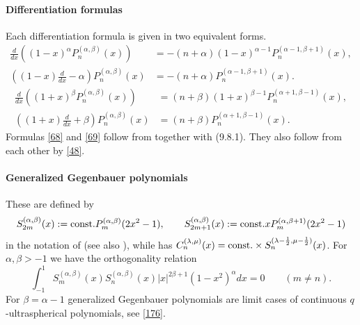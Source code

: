 \documentclass[twoside,11pt]{article}
\newcommand\al\alpha
\newcommand\be\beta
\newcommand\la\lambda
\newcommand\half{\frac12}
\newcommand\const{{\rm const.} }
\begin{document}
\paragraph{Differentiation formulas}
Each differentiation formula is given in two equivalent forms.
\begin{equation}
\begin{split}
\frac d{dx}\left((1-x)^\al P_n^{(\al,\be)}(x)\right)&=
-(n+\al) (1-x)^{\al-1} P_n^{(\al-1,\be+1)}(x),\\
\left((1-x)\frac d{dx}-\al\right)P_n^{(\al,\be)}(x)&=
-(n+\al) P_n^{(\al-1,\be+1)}(x).
\end{split}
\label{68}
\end{equation}
%
\begin{equation}
\begin{split}
\frac d{dx}\left((1+x)^\be P_n^{(\al,\be)}(x)\right)&=
(n+\be) (1+x)^{\be-1} P_n^{(\al+1,\be-1)}(x),\\
\left((1+x)\frac d{dx}+\be\right)P_n^{(\al,\be)}(x)&=
(n+\be) P_n^{(\al+1,\be-1)}(x).
\end{split}
\label{69}
\end{equation}
Formulas \eqref{68} and \eqref{69} follow from
together with (9.8.1). They also follow from each other by \eqref{48}.
%
\paragraph{Generalized Gegenbauer polynomials}
These are defined by
\begin{equation}
S_{2m}^{(\al,\be)}(x):=\const P_m^{(\al,\be)}(2x^2-1),\qquad
S_{2m+1}^{(\al,\be)}(x):=\const x P_m^{(\al,\be+1)}(2x^2-1)
\label{70}
\end{equation}
in the notation of 
(see also \cite{K27}), while \cite[Section 1.5.2]{K26}
has $C_n^{(\la,\mu)}(x)=\const\allowbreak\times S_n^{(\la-\half,\mu-\half)}(x)$.
For $\al,\be>-1$ we have the orthogonality relation
\begin{equation}
\int_{-1}^1 S_m^{(\al,\be)}(x) S_n^{(\al,\be)}(x) |x|^{2\be+1}(1-x^2)^\al dx
=0\qquad(m\ne n).
\label{71}
\end{equation}
For $\be=\al-1$ generalized Gegenbauer polynomials are limit cases of
continuous $q$-ultraspherical polynomials, see \eqref{176}.
\end{document}
